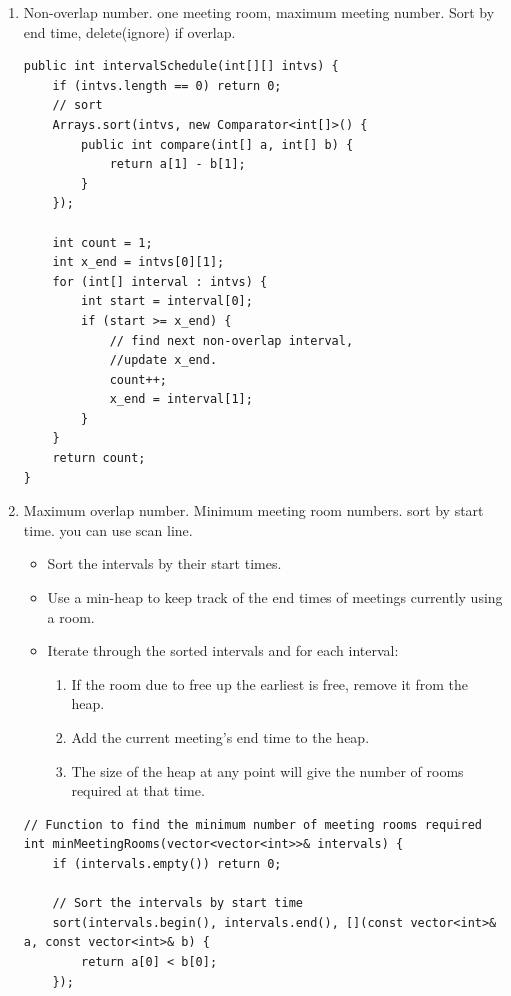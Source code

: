 \documentclass[a4paper,11pt,twoside]{book}
\begin{document}
\begin{enumerate}
	\item Non-overlap number. one meeting room, maximum meeting number. Sort by end time, delete(ignore) if overlap. 
\begin{lstlisting}
public int intervalSchedule(int[][] intvs) {
	if (intvs.length == 0) return 0;
	// sort
	Arrays.sort(intvs, new Comparator<int[]>() {
		public int compare(int[] a, int[] b) {
			return a[1] - b[1];
		}
	});
	
	int count = 1;
	int x_end = intvs[0][1];
	for (int[] interval : intvs) {
		int start = interval[0];
		if (start >= x_end) {
			// find next non-overlap interval, 
			//update x_end. 
			count++;
			x_end = interval[1];
		}
	}
	return count;
}	
\end{lstlisting}
	
	
	\item Maximum overlap number. Minimum meeting room numbers. sort by start time. you can use scan line.  
\begin{itemize}
	\item Sort the intervals by their start times.
	
	\item Use a min-heap to keep track of the end times of meetings currently using a room.
	
	\item Iterate through the sorted intervals and for each interval:
	
	\begin{enumerate}
		\item If the room due to free up the earliest is free, remove it from the heap.
		
		\item Add the current meeting's end time to the heap.
		
		\item The size of the heap at any point will give the number of rooms required at that time.	
	\end{enumerate}
\end{itemize}

\begin{lstlisting}
// Function to find the minimum number of meeting rooms required
int minMeetingRooms(vector<vector<int>>& intervals) {
	if (intervals.empty()) return 0;
	
	// Sort the intervals by start time
	sort(intervals.begin(), intervals.end(), [](const vector<int>& a, const vector<int>& b) {
		return a[0] < b[0];
	});
	

\end{lstlisting}
\end{enumerate}
\end{document}
